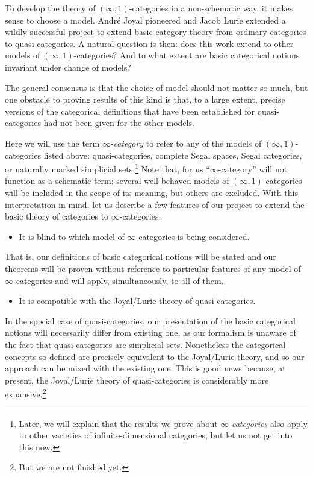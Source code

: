 \documentclass[12pt,reqno]{amsart}
\theoremstyle{plain}
\theoremstyle{definition}
\theoremstyle{remark}
\numberwithin{equation}{subsection}
\begin{document}
To develop the theory of $(\infty,1)$-categories in a non-schematic way, it makes sense to choose a model. Andr\'e Joyal pioneered and Jacob Lurie extended a wildly successful project to extend basic category theory from ordinary categories to quasi-categories. A natural question is then: does this work extend to other models of $(\infty,1)$-categories? And to what extent are basic categorical notions invariant under change of models? 

The general consensus is that the choice of model should not matter so much, but one obstacle to proving results of this kind is that, to a large extent, precise versions of the categorical definitions that have been established for quasi-categories had not been given for the other models. 

Here we will use the term $\infty$-\emph{category} to refer to any of the models of $(\infty,1)$-categories listed above: quasi-categories, complete Segal spaces, Segal categories, or naturally marked simplicial sets.\footnote{Later, we will explain that the results we prove about $\infty$-\emph{categories} also apply to  other varieties of infinite-dimensional categories, but let us not get into this now.} Note that, for us ``$\infty$-category'' will not function as a schematic term: several well-behaved models of $(\infty,1)$-categories will be included in the scope of its meaning, but others are excluded.  With this interpretation in mind, let us describe a few features of our project to extend the basic theory of categories to $\infty$-categories.
\begin{itemize}
\item It is blind to which model of $\infty$-categories is being considered.
\end{itemize}
That is, our definitions of basic categorical notions will be stated and our theorems will be proven without reference to particular features of any model of $\infty$-categories and will apply, simultaneously, to all of them. 
\begin{itemize}
\item It is compatible with the Joyal/Lurie theory of quasi-categories.
\end{itemize}
In the special case of quasi-categories, our presentation of the basic categorical notions will necessarily differ from existing one, as our formalism is unaware of the fact that quasi-categories are simplicial sets. Nonetheless the categorical concepts so-defined are precisely equivalent to the Joyal/Lurie theory, and so our approach can be mixed with the existing one. This is good news because, at present, the Joyal/Lurie theory of quasi-categories is considerably more expansive.\footnote{But we are not finished yet.}
\end{document}
